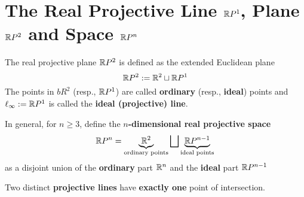 \section{The Real Projective Line \(\mathbb{R} P^1\), Plane \(\mathbb{R} P^2\) and Space \(\mathbb{R} P^n\)}

\begin{definition}
    \begin{statements}{}
        \item The real projective plane \(\mathbb{R} P^2\) is defined as the extended Euclidean plane
        \[\mathbb{R} P^2 := \mathbb{R}^2 \sqcup \mathbb{R} P^1\]
        The points in \(bR^2\) (resp., \(\mathbb{R} P^1\)) are called \textbf{ordinary} (resp., \textbf{ideal}) points and \(\ell_\infty := \mathbb{R} P^1\) is called the \textbf{ideal (projective) line}.
        \item In general, for \(n \geq 3\), define the \textbf{\(n\)-dimensional real projective space}
        \[\mathbb{R} P^n = \underbrace{\mathbb{R}^2}_{\text{ordinary points}} \bigsqcup \underbrace{\mathbb{R} P^{n- 1}}_{\text{ideal points}}\]
        as a disjoint union of the \textbf{ordinary} part \(\mathbb{R}^n\) and the \textbf{ideal} part \(\mathbb{R} P^{n-1}\)
    \end{statements}
\end{definition}

\begin{proposition}
    Two distinct \textbf{projective lines} have \textbf{exactly one} point of intersection.
\end{proposition}